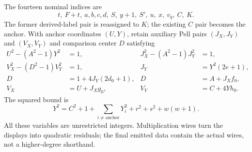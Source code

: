 The fourteen nominal indices are
\begin{equation}\label{eq:indices}
 t,\ F+t,\ a,b,c,d,\ S,\ y+1,\ S',\ u,\ x,\ v_q,\ C,\ K.
\end{equation}
The former derived-label pair is reassigned to $K$; the existing $C$
pair becomes the anchor. With anchor coordinates $(U,Y)$, retain auxiliary
Pell pairs $(J_X,J_Y)$ and $(V_X,V_Y)$ and comparison center $D$ satisfying
\begin{align*}
 U^2-(A^2-1)Y^2&=1,&J_X^2-(A^2-1)J_Y^2&=1,\\
 V_X^2-(D^2-1)V_Y^2&=1,&J_Y&=Y^2(2e+1),\\
 D&=1+4J_Y(2d_0+1),&D&=A+J_Xf_0,\\
 V_X&=U+J_Xg_0,&V_Y&=C+4Yh_0.
\end{align*}
The squared bound is
\begin{equation}\label{eq:cap}
 Y^2=C^2+1+\sum_{i\ne\mathrm{anchor}}Y_i^2
             +r^2+s^2+w(w+1).
\end{equation}
All these variables are unrestricted integers. Multiplication wires turn
the displays into quadratic residuals; the final emitted data contain the
actual wires, not a higher-degree shorthand.

